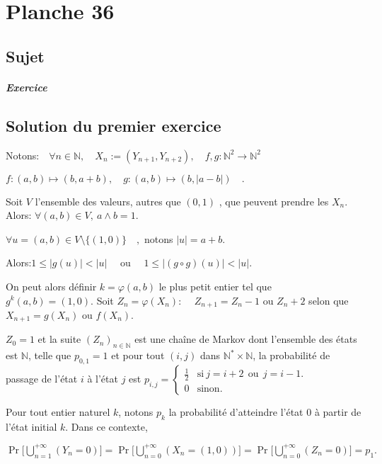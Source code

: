 \chapter{Planche 36}

\section{Sujet}

\paragraph{Exercice}

\section{Solution du premier exercice}
Notons:$\quad\forall n \in \mathbb N  ,\quad X_n := (Y_{n+1},Y_{n+2}),\quad f,g: \mathbb N^2 \to \mathbb N^2 \quad$
 
 $ f:(a,b)\mapsto (b,a+b), \quad g:(a,b) \mapsto (b,|a-b|)\quad.$
  
 
  Soit $V$ l'ensemble des valeurs, autres que $(0,1)$ , que peuvent prendre les $X_n.\quad$ Alors: $\forall (a,b) \in V,\: a\wedge b =1.$ 
  
  $ \forall u= (a,b) \in V\setminus\{(1,0)\}\quad,$ notons $|u| = a+b.$
  
  Alors:$1\leqslant |g(u)|< |u|\quad$ ou $\quad 1\leqslant  |(g\circ g)(u)| < |u|.$
  
  On peut alors définir $ k= \varphi(a,b)$  le plus petit entier tel que $g^k (a,b) =(1,0).$  Soit $Z_n = \varphi (X_n)$:
  $\quad Z_{n+1} = Z_n-1$ ou $Z_n +2$ selon que $X_{n+1}= g(X_n)$ ou $ f(X_n).$
  
  $Z_0 =1$ et la suite $(Z_n) _{n\in \mathbb N} $ est une chaîne de Markov dont l'ensemble des états est $\mathbb N$, telle que $p_{0,1}=1$  et pour tout $(i,j)$ dans $\mathbb N^*\times \mathbb N$, la probabilité de passage de l'état $i$ à l'état $j$ est $p_{i,j} = \left\{ \begin{array} {cl} \frac12& \text{si}\: j=i+2 \: \:\text{ou}\:\: j=i-1. \\ 0 &\text{sinon}. \end{array} \right.$
  
  Pour tout entier naturel $k$, notons $p_k$ la probabilité d'atteindre l'état $0$ à partir de l'état initial $k$. 
  Dans ce contexte,
  
  $ \displaystyle \Pr\Big [\bigcup _{n=1}^{+\infty} (Y_n =0) \Big]=\Pr\Big[\bigcup _{n=0}^{+\infty} (X_n=(1,0))\Big] =\Pr\Big[\bigcup _{n=0}^{+\infty} (Z_n =0)\Big]= p_1.$
  
